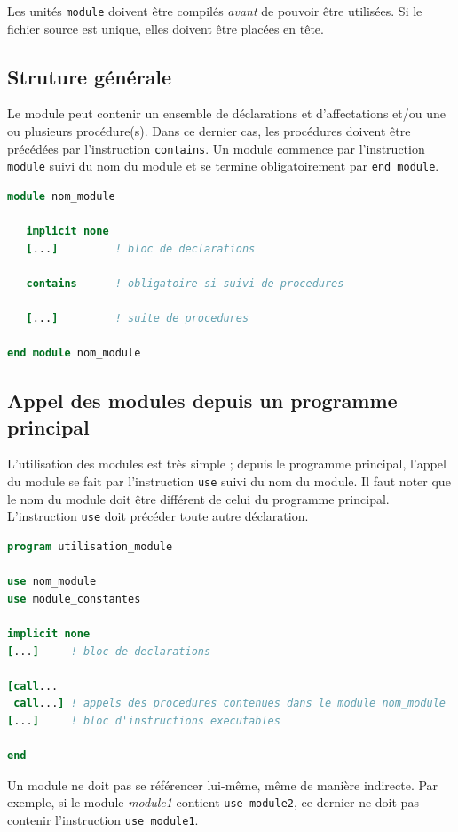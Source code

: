 \documentclass[a4paper,twoside]{article}
\begin{document}
\begin{attention}
Les unités \texttt{module} doivent être compilés \emph{avant} de pouvoir être utilisées. Si le fichier source est unique, elles doivent être placées en tête.
\end{attention}


\subsection{Struture générale}
Le module peut contenir un ensemble de déclarations et d'affectations et/ou une ou plusieurs procédure(s). Dans ce dernier cas, les procédures doivent être précédées par l'instruction \texttt{contains}. Un module commence par l'instruction \texttt{module} suivi du nom du module et se termine obligatoirement par \texttt{end module}.

\begin{lstlisting}[language=Fortran]
module nom_module
   
   implicit none 
   [...]         ! bloc de declarations 

   contains      ! obligatoire si suivi de procedures
   
   [...]         ! suite de procedures
 
end module nom_module
\end{lstlisting}

\subsection{Appel des modules depuis un programme principal}
L'utilisation des modules est très simple ; depuis le programme principal, l'appel du module se fait par l'instruction \texttt{use} suivi du nom du module. Il faut noter que le nom du module doit être différent de celui du programme principal. L'instruction \texttt{use} doit précéder toute autre déclaration.

\begin{lstlisting}[language=Fortran]
program utilisation_module

use nom_module 
use module_constantes

implicit none 
[...]     ! bloc de declarations

[call...
 call...] ! appels des procedures contenues dans le module nom_module
[...]     ! bloc d'instructions executables
 
end 
\end{lstlisting}

\begin{remarque}
Un module ne doit pas se référencer lui-même, même de manière indirecte. Par exemple, si le module \emph{module1} contient \texttt{use module2}, ce dernier ne doit pas contenir l'instruction \texttt{use module1}.
\end{remarque}
\end{document}

